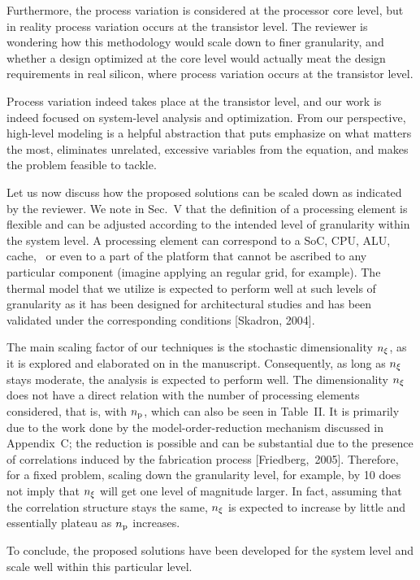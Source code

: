 \begin{reviewer}
Furthermore, the process variation is considered at the processor core level,
but in reality process variation occurs at the transistor level. The reviewer
is wondering how this methodology would scale down to finer granularity, and
whether a design optimized at the core level would actually meat the design
requirements in real silicon, where process variation occurs at the transistor
level.
\end{reviewer}

\begin{authors}
Process variation indeed takes place at the transistor level, and our work is
indeed focused on system-level analysis and optimization. From our perspective,
high-level modeling is a helpful abstraction that puts emphasize on what matters
the most, eliminates unrelated, excessive variables from the equation, and makes
the problem feasible to tackle.

Let us now discuss how the proposed solutions can be scaled down as indicated by
the reviewer. We note in Sec.~V that the definition of a processing element is
flexible and can be adjusted according to the intended level of granularity
within the system level. A processing element can correspond to a SoC, CPU, ALU,
cache, \etc\ or even to a part of the platform that cannot be ascribed to any
particular component (imagine applying an regular grid, for example). The
thermal model that we utilize is expected to perform well at such levels of
granularity as it has been designed for architectural studies and has been
validated under the corresponding conditions [Skadron, 2004].

The main scaling factor of our techniques is the stochastic dimensionality
${n_\xi}$, as it is explored and elaborated on in the manuscript. Consequently,
as long as ${n_\xi}$ stays moderate, the analysis is expected to perform well.
The dimensionality ${n_\xi}$ does not have a direct relation with the number of
processing elements considered, that is, with ${n_\text{p}}$, which can also be seen in
Table~II. It is primarily due to the work done by the model-order-reduction
mechanism discussed in Appendix~C; the reduction is possible and can be
substantial due to the presence of correlations induced by the fabrication
process [Friedberg,~2005]. Therefore, for a fixed problem, scaling down the
granularity level, for example, by 10 does not imply that ${n_\xi}$ will get one
level of magnitude larger. In fact, assuming that the correlation structure
stays the same, ${n_\xi}$ is expected to increase by little and essentially
plateau as ${n_\text{p}}$ increases.

To conclude, the proposed solutions have been developed for the system level
and scale well within this particular level.

\begin{actions}
\end{actions}
\end{authors}

